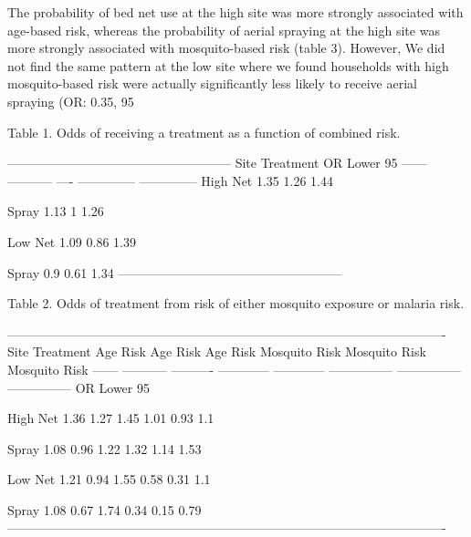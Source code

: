\documentclass{article}\usepackage[]{graphicx}\usepackage[]{color}
\begin{document}
The probability of bed net use at the high site was more strongly associated with age-based risk,  whereas the probability of aerial spraying at the high site was more strongly associated with mosquito-based risk (table 3).  However,  We did not find the same pattern at the low site where we found households with high mosquito-based risk were actually significantly less likely to receive aerial spraying (OR: 0.35,  95%

Table 1. Odds of receiving a treatment as a function of combined risk.

-----------------------------------------------------
 Site   Treatment   OR   Lower 95%
------ ----------- ---- -------------- --------------
 High      Net     1.35      1.26           1.44     

          Spray    1.13       1             1.26     

 Low       Net     1.09      0.86           1.39     

          Spray    0.9       0.61           1.34     
-----------------------------------------------------





Table 2.  Odds of treatment from risk of either mosquito exposure or malaria risk.

-------------------------------------------------------------------------------------------------------
 Site   Treatment   Age Risk    Age Risk     Age Risk    Mosquito Risk   Mosquito Risk   Mosquito Risk 
------ ----------- ---------- ------------ ------------ --------------- --------------- ---------------
                       OR     Lower 95%

 High      Net        1.36        1.27         1.45          1.01            0.93             1.1      

          Spray       1.08        0.96         1.22          1.32            1.14            1.53      

 Low       Net        1.21        0.94         1.55          0.58            0.31             1.1      

          Spray       1.08        0.67         1.74          0.34            0.15            0.79      
-------------------------------------------------------------------------------------------------------
\end{document}
